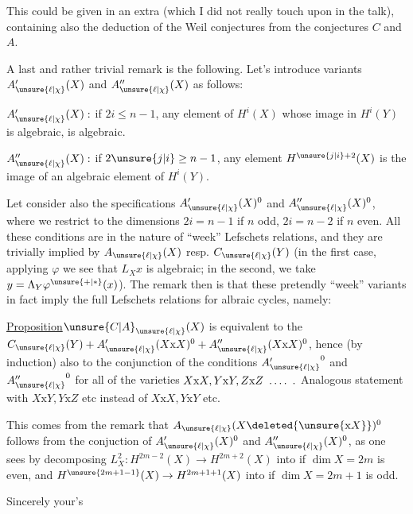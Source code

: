 
This could be given in an extra  (which I did not really touch upon in the talk), containing also the deduction of the Weil conjectures from the conjectures $C$ and $A$.

A last and rather trivial remark is the following. Let's introduce  variants $A'_{\unsure{\ell|\chi}}(X)$ and $A''_{\unsure{\ell|\chi}}(X)$ as follows:

$A'_{\unsure{\ell|\chi}}(X):$ if $2i\leq n-1$, any element  of $H^i(X)$ whose image in $H^i(Y)$ is algebraic, is algebraic.

$A''_{\unsure{\ell|\chi}}(X):$ if $2\unsure{j|i}\geq n-1$, any  element   $H^{\unsure{j|i}+2}(X)$ is  the image of an algebraic element of $H^i(Y)$.

Let  consider also the specifications $A'_{\unsure{\ell|\chi}}(X)^0$ and $A''_{\unsure{\ell|\chi}}(X)^0$, where we restrict to the  dimensions $2i=n-1$ if $n$ odd, $2i=n-2$ if $n$ even. All these conditions are in the nature of ``week'' Lefschets relations, and they are trivially implied by $A_{\unsure{\ell|\chi}}(X)$ resp. $C_{\unsure{\ell|\chi}}(Y)$ (in the first case, applying $\varphi$ we see that $L_Xx$ is algebraic; in the second, we take $y=\Lambda_Y\varphi^{\unsure{+|*}}(x)$). The remark then is that these pretendly ``week'' variants in fact imply the full Lefschets relations for albraic cycles, namely:

\uline{Proposition}\quad $\unsure{C|A}_{\unsure{\ell|\chi}}(X)$ is equivalent to the  $C_{\unsure{\ell|\chi}}(Y)+A'_{\unsure{\ell|\chi}}(X\mathrm{x} X)^0+A''_{\unsure{\ell|\chi}}(X\mathrm{x} X)^0$, hence (by induction) also to the conjunction of the conditions ${A'_{\unsure{\ell|\chi}}}^0$ and ${A''_{\unsure{\ell|\chi}}}^0$ for all of the varieties $X\mathrm{x} X,Y\mathrm{x} Y,Z\mathrm{x} Z\ \mathinner{\ldotp\ldotp\ldotp\ldotp}\ .$ Analogous statement with $X\mathrm{x} Y,Y\mathrm{x} Z$ etc instead of $X\mathrm{x} X,Y\mathrm{x} Y$ etc.

This comes from the remark that  $A_{\unsure{\ell|\chi}}(X\deleted{\unsure{\mathrm{x} X}})^0$ follows from the conjuction of $A'_{\unsure{\ell|\chi}}(X)^0$ and $A''_{\unsure{\ell|\chi}}(X)^0$, as one sees by decomposing $L_X^2:H^{2m-2}(X)\to H^{2m+2}(X)$ into
if $\dim X=2m$ is even, and $H^{\unsure{2m+1-1}}(X)\to H^{2m+1+1}(X)$ into
if $\dim X=2m+1$ is odd.

Sincerely your's

